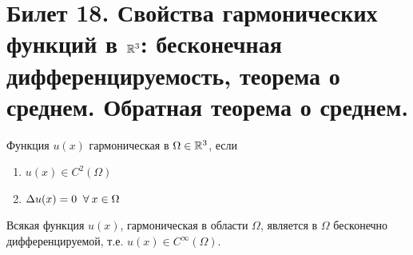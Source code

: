 \section{Билет 18. Свойства гармонических функций в $\mathbb{R}^3$: бесконечная дифференцируемость, теорема о среднем. Обратная теорема о среднем.}
\begin{definition} Функция $u(x)$ гармоническая в $\Omega \in \mathbb{R}^3$, если 
\begin{enumerate}
\item $u(x) \in C^2 (\Omega)$
\item $\Delta u(x) = 0 \;\;\forall\: x \in \Omega$ 
\end{enumerate}
\end{definition}
\begin{theorem}
Всякая функция $u(x)$, гармоническая в области $\Omega$, является в $\Omega$ бесконечно дифференцируемой, т.е. $u(x) \in C^{\infty}(\Omega).$
\end{theorem}
